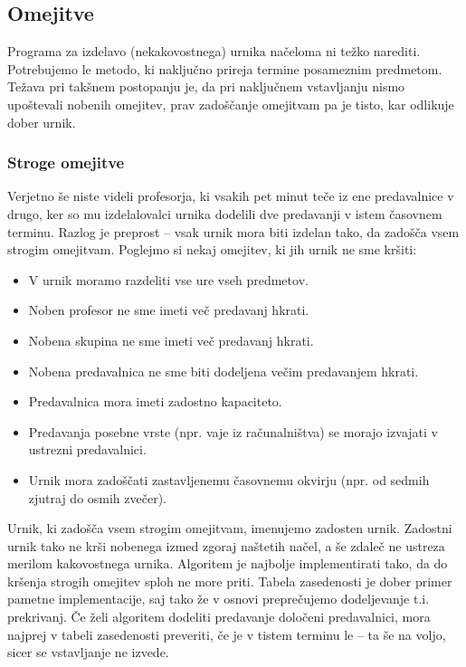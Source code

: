 \documentclass[a4paper, 10pt]{article}
\begin{document}
\subsection{Omejitve}

Programa za izdelavo (nekakovostnega) urnika načeloma ni težko narediti. Potrebujemo
le metodo, ki naključno prireja termine posameznim predmetom. Težava pri takšnem postopanju
je, da pri naključnem vstavljanju nismo upoštevali nobenih omejitev, prav zadoščanje omejitvam
pa je tisto, kar odlikuje dober urnik.

\subsubsection{Stroge omejitve}

Verjetno še niste videli profesorja, ki vsakih pet minut teče iz ene predavalnice v drugo,
ker so mu izdelalovalci urnika dodelili dve predavanji v istem časovnem terminu. Razlog
je preprost -- vsak urnik mora biti izdelan tako, da zadošča vsem strogim omejitvam.
Poglejmo si nekaj omejitev, ki jih urnik ne sme kršiti:

\begin{itemize}
   \item V urnik moramo razdeliti vse ure vseh predmetov.
   \item Noben profesor ne sme imeti več predavanj hkrati.
   \item Nobena skupina ne sme imeti več predavanj hkrati.
   \item Nobena predavalnica ne sme biti dodeljena večim predavanjem hkrati.
   \item Predavalnica mora imeti zadostno kapaciteto.
   \item Predavanja posebne vrste (npr. vaje iz računalništva) se morajo izvajati v ustrezni predavalnici.
   \item Urnik mora zadoščati zastavljenemu časovnemu okvirju (npr. od sedmih zjutraj do osmih zvečer).
\end{itemize}

Urnik, ki zadošča vsem strogim omejitvam, imenujemo zadosten urnik. Zadostni urnik tako ne
krši nobenega izmed zgoraj naštetih načel, a še zdaleč ne ustreza merilom kakovostnega urnika.
Algoritem je najbolje implementirati tako, da do kršenja strogih omejitev sploh ne more priti.
Tabela zasedenosti je dober primer pametne implementacije, saj tako že v osnovi  preprečujemo
dodeljevanje t.i. prekrivanj. Če želi algoritem dodeliti predavanje določeni predavalnici,
mora najprej v tabeli zasedenosti preveriti, če je v tistem terminu le -- ta še na voljo,
sicer se vstavljanje ne izvede.
\end{document}
